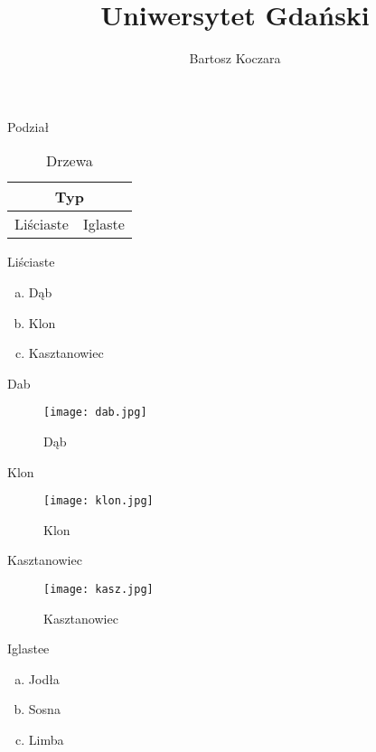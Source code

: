 \documentclass{beamer}
\title{Uniwersytet Gdański}
\author{Bartosz Koczara}
\begin{document}
\begin{frame}
\titlepage
\end{frame}

\begin{frame}{Podział}
\begin{table}
\begin{center}
\begin{tabular}{ |p{3cm}|p{3cm}| }
 \hline
 \multicolumn{2}{|c|}{Typ} \\
 \hline
 Liściaste &Iglaste\\
\hline
\end{tabular}
\caption{Drzewa}
\label{t1}
\end{center}
\end{table}
\end{frame}

\begin{frame}{Liściaste}
\begin{enumerate}[a)]
\item Dąb
\pause
\item Klon
\pause
\item Kasztanowiec
\end{enumerate}
\end{frame}

\begin{frame}{Dab}
\begin{figure}[h!]
\texttt{[image: dab.jpg]}
\caption{Dąb \cite{Wiki}}
\label{dab}
\end{figure}
\end{frame}

\begin{frame}{Klon}
\begin{figure}[h!]
\texttt{[image: klon.jpg]}
\caption{Klon \cite{Wiki}}
\label{klo}
\end{figure}
\end{frame}

\begin{frame}{Kasztanowiec}
\begin{figure}[h!]
\texttt{[image: kasz.jpg]}
\caption{Kasztanowiec \cite{Wiki}}
\label{kas}
\end{figure}
\end{frame}

\begin{frame}{Iglastee}
\begin{enumerate}[a)]
\item Jodła
\pause
\item Sosna
\pause
\item Limba
\end{enumerate}
\end{frame}
\end{document}
